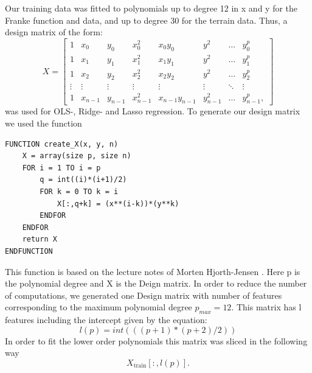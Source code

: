 Our training data was fitted to polynomials up
to degree 12 in x and y for the Franke function and data, and up to degree 30
for the terrain data. Thus, a design matrix of the form:
\begin{equation*}
    X = 
    \begin{bmatrix}

        1 & x_{0} & y_0 & x_{0}^{2} & x_0 y_0 & y^2 & \dots &y_{0}^{p} \\
        1 & x_{1} & y_1 & x_{1}^{2} & x_1 y_1 & y^2 & \dots &y_{1}^{p} \\
        1 & x_{2} & y_2 & x_{2}^{2} & x_2 y_2 & y^2 & \dots &y_{2}^{p} \\
        \vdots &\vdots &\vdots &\vdots &\vdots & \vdots & \ddots & \vdots \\
        1&x_{n-1} & y_{n-1} & x_{n-1}^2 & x_{n-1} y_{n-1} & y_{n-1}^2 & \dots &y_{n-1}^{p}, 
    \end{bmatrix}
\end{equation*}
was used for OLS-, Ridge- and Lasso regression. To generate our design matrix we used the function
\begin{lstlisting}
FUNCTION create_X(x, y, n)
	X = array(size p, size n)
	FOR i = 1 TO i = p
		q = int((i)*(i+1)/2)
		FOR k = 0 TO k = i
			X[:,q+k] = (x**(i-k))*(y**k)
		ENDFOR
	ENDFOR
	return X
ENDFUNCTION
\end{lstlisting}
This function is based on the lecture notes of Morten Hjorth-Jensen \cite{w35}.
Here p is the polynomial degree and X is the Deign matrix. 
In order to reduce the number of computations, we generated one Design matrix
with number of features corresponding to the maximum polynomial degree $p_{max}
= 12$. This matrix has l features including the intercept given by the
equation: 
\begin{equation}
        \label{eq:l_features} 
        l(p) = int(((p+1)*(p+2)/2))		
\end{equation}
In order to fit the lower order polynomials this matrix was sliced in the
following way
\begin{equation*}
    X_{\text{train}}[:,l(p)].
\end{equation*}

  




